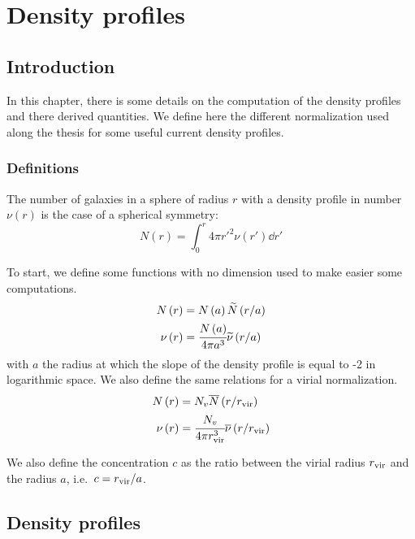 \chapter{Density profiles}
\label{cha:profiles}

\section{Introduction}

In this chapter, there is some details on the computation of the density
profiles and there derived quantities. We define here the different
normalization used along the thesis for some useful current density profiles.

\subsection{Definitions}

The number of galaxies in a sphere of radius $r$ with a density profile in
number $\nu(r)$ is the case of a spherical symmetry:
%
\begin{equation}
    N\left(r\right)=\int_0^r4\pi {r'}^2 \nu(r')\dd{r'}
\end{equation}

To start, we define some functions with no dimension used to make easier some
computations.
%
\begin{eqnarray}
    N\left(r\right)&=N\left(a\right){\widetilde{N}\left(r/a\right)}\nonumber\\
    \nu\left(r\right)&=
        \cfrac{N\left(a\right)}{4\pi{a^3}}
        \widetilde\nu\left(r/a\right)\nonumber\\
\end{eqnarray}
%
with $a$ the radius at which the slope of the density profile is equal to -2 in
logarithmic space. We also define the same relations for a virial
normalization.
%
\begin{eqnarray}
    N\left(r\right)&={N_v}{\overline{N}\left(r/r_{\rm vir}\right)}\nonumber\\
    \nu\left(r\right)&=
        \cfrac{N_v}{4\pi r_{\rm vir}^3}\overline\nu\left(r/r_{\rm vir}\right)\nonumber\\
\end{eqnarray}

We also define the concentration $c$ as the ratio between the virial radius
$r_{\rm vir}$ and the radius $a$, i.e.\ $c=r_{\rm vir}/a$.

\section{Density profiles}
\label{sec:density_profiles}

